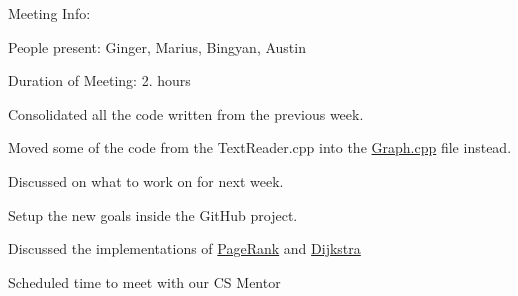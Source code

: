 Meeting Info\+:

People present\+: Ginger, Marius, Bingyan, Austin

Duration of Meeting\+: 2. hours


\begin{DoxyEnumerate}
\item Consolidated all the code written from the previous week.
\begin{DoxyItemize}
\item Moved some of the code from the Text\+Reader.\+cpp into the \mbox{\hyperlink{Graph_8cpp_source}{Graph.\+cpp}} file instead.
\end{DoxyItemize}
\item Discussed on what to work on for next week.
\begin{DoxyItemize}
\item Setup the new goals inside the Git\+Hub project.
\end{DoxyItemize}
\item Discussed the implementations of \mbox{\hyperlink{classPageRank}{Page\+Rank}} and \mbox{\hyperlink{classDijkstra}{Dijkstra}}
\item Scheduled time to meet with our CS Mentor 
\end{DoxyEnumerate}